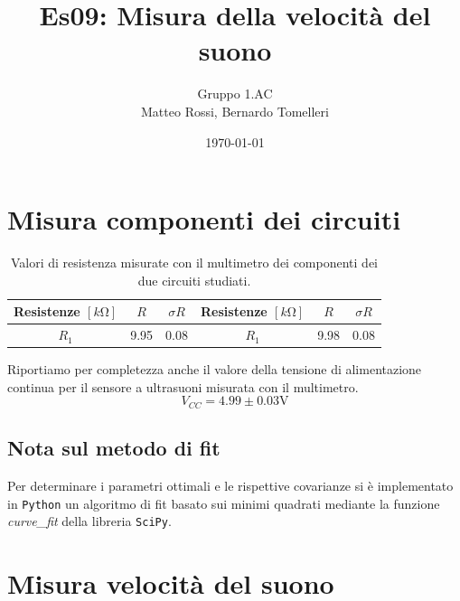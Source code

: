 \documentclass[10pt, a4paper, italian]{article}
\author{Gruppo 1.AC \\ Matteo Rossi, Bernardo Tomelleri}
\title{Es09: Misura della velocità del suono}
\begin{document}
\date{\today}
\maketitle

\setcounter{section}{0}

\section*{Misura componenti dei circuiti}
\begin{table}[htbp]
\centering
\begin{tabular}{ccc|ccc}
\toprule
Resistenze $[\si{k\ohm}]$ & $R$ & $\sigma R$ & Resistenze $[\si{k\ohm}]$ & $R$ &
$\sigma R$ \\
\midrule
\midrule
$R_1$	  	& 9.95 	& 0.08		& $R_1$ & 9.98	& 0.08 \\
\bottomrule
\end{tabular}
\caption{Valori di resistenza misurate con il multimetro dei componenti dei
due circuiti studiati. \label{tab: rcmes_B}}
\end{table}

Riportiamo per completezza anche il valore della tensione di alimentazione
continua per il sensore a ultrasuoni misurata con il multimetro.
\[
V_{CC} = 4.99 \pm 0.03 \si{\V}
\]

\subsection*{Nota sul metodo di fit}
Per determinare i parametri ottimali e le rispettive covarianze si \`e
implementato in \verb+Python+ un algoritmo di fit basato sui minimi quadrati
mediante la funzione \emph{curve\_fit} della libreria \texttt{SciPy}.

\section{Misura velocità del suono}
\end{document}
